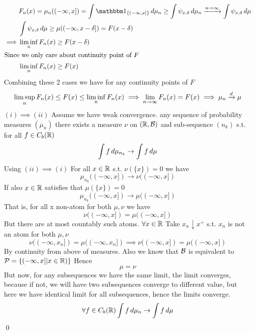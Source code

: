 \begin{align*}
    &F_n(x) = \mu_n((-\infty, x])  = \int \I_{\{(-\infty, x]\}} \diff\mu_n \geq \int \psi_{x,\delta} \diff\mu_n \xrightarrow{n \rightarrow \infty} \int \psi_{x,\delta} \diff\mu \\
    &\int \psi_{x,\delta} \diff\mu \geq \mu((-\infty, x-\delta]) = F(x-\delta)\\
    \implies& \linf{n}F_n(x) \geq F(x-\delta)\\
    \intertext{Since we only care about continuity point of $F$}
    &\linf{n}F_n(x) \geq F(x)
\end{align*}Combining these 2 cases we have for any continuity points of $F$
\begin{equation*}
    \limsup\limits_{n}F_n(x) \leq F(x) \leq \liminf\limits_{n}F_n(x) \implies  \lim\limits_{n\rightarrow\infty}F_n(x) = F(x) \implies \mu_n \xrightarrow{d} \mu
\end{equation*}
$(i)\implies (ii)$ Assume we have weak convergence. any sequence of probability measures $(\mu_n)$ there exists a measure $\nu$ on $(\mathbb{R}, \mathcal{B})$ and sub-sequence $(n_k)$ s.t. for all $f\in C_b(\mathbb{R})$
\begin{equation*}
    \int f\mathop{}\!d \mu_{n_k} \rightarrow \int f \mathop{}\!d\mu
\end{equation*}Using $(ii)\implies (i)$ For all $x\in \mathbb{R}$ s.t. $\nu(\{x\}) = 0$ we have\begin{equation*}
    \mu_{n_k}((-\infty, x]) \rightarrow \nu((-\infty, x])
\end{equation*}If also $x\in \mathbb{R}$ satisfies that $\mu(\{x\}) = 0$
\begin{equation*}
    \mu_{n_k}((-\infty, x]) \rightarrow \mu((-\infty, x])
\end{equation*}That is, for all x non-atom for both $\mu, \nu$ we have \begin{equation*}
    \nu((-\infty, x]) = \mu((-\infty, x])
\end{equation*}But there are at most countably such atoms. $\forall x\in \mathbb{R}$ Take $x_n \downarrow x^+$ s.t. $x_n$ is not an atom for both $\mu, \nu$
\begin{equation*}
    \nu((-\infty, x_n]) = \mu((-\infty, x_n]) \implies \nu((-\infty, x]) = \mu((-\infty, x])
\end{equation*} By continuity from above of measures. Also we know that $\mathcal{B}$ is equivalent to $\mathcal{P} = \{(-\infty, x]|x\in \mathbb{R})\}$ Hence \begin{equation*}
    \mu = \nu
\end{equation*}
But now, for any subsequences we have the same limit, the limit converges, because if not, we will have two subsequences converge to different value, but here we have identical limit for all subsequences, hence the limits converge.
\begin{equation*}
    \forall f\in C_b(\mathbb{R}) \int f \mathop{}\!d\mu_n \rightarrow \int f \mathop{}\!d\mu
\end{equation*}
\qed


